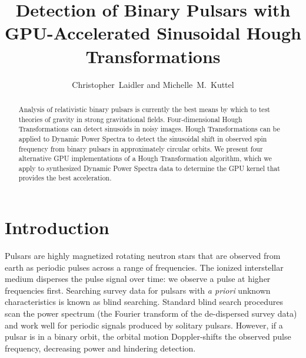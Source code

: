 


\resetcounters



\title{Detection of Binary Pulsars with GPU-Accelerated Sinusoidal Hough Transformations}
\author{Christopher~Laidler and Michelle~M.~Kuttel
}

\begin{abstract}
Analysis of relativistic binary pulsars is currently the best means by which to test theories of gravity in strong gravitational fields.
Four-dimensional Hough Transformations can detect sinusoids in noisy images.
Hough Transformations can be applied to Dynamic Power Spectra to detect the sinusoidal shift in observed spin frequency from binary pulsars in approximately circular orbits.
We present four  alternative GPU implementations of a Hough Transformation algorithm, which we apply to synthesized  Dynamic Power Spectra data to determine  the GPU kernel that provides the best acceleration.
\end{abstract}

\section{Introduction}
Pulsars are highly magnetized rotating neutron stars that are observed from earth as periodic pulses across a range of frequencies.
The ionized interstellar medium disperses the pulse signal over time:  we observe a pulse at higher frequencies first.
Searching survey data for pulsars with \emph{a priori }unknown characteristics is known as blind searching.
Standard blind search procedures scan the power spectrum (the Fourier transform of the de-dispersed survey data) and work well for periodic signals produced by solitary pulsars.
However, if a pulsar is in a binary orbit, the orbital motion Doppler-shifts the observed pulse frequency, decreasing power and hindering detection.

